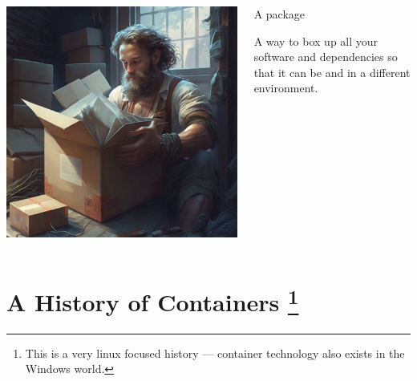 \documentclass{slide}
\begin{document}
\begin{frame}
    \vspace{-2em}
    \begin{columns}
    \begin{column}{0.6\textwidth}
    \begin{center}
    \includegraphics[height=0.95\textheight]{images/packaging}
    \end{center}
    \end{column}

    \begin{column}{0.4\textwidth}
    {\color{primary}\large A package}
    \vspace{1em}

    A way to box up all your software and dependencies
    so that it can be  and  in a different environment.
    \end{column}
    \end{columns}
\end{frame}

\section{A History of Containers %
\footnote{This is a very linux focused history --- container technology also exists in the Windows world.}}
\end{document}
